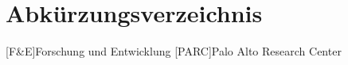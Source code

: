 \section*{Abkürzungsverzeichnis}
\begin{acronym}[AAAAAAA]
    [F\&E]{Forschung und Entwicklung}
    [PARC]{Palo Alto Research Center}
\end{acronym}
